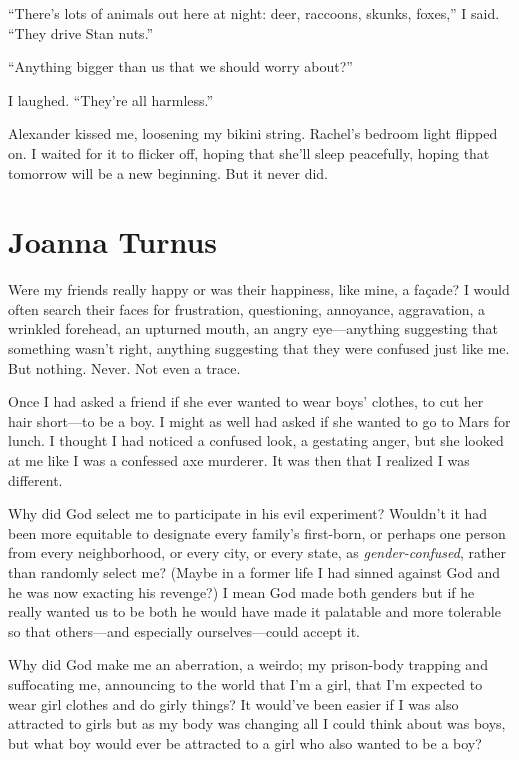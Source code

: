 ``There's lots of animals out here at night: deer, raccoons, skunks,
foxes,'' I said. ``They drive Stan nuts.''

``Anything bigger than us that we should worry about?''

I laughed. ``They're all harmless.''

Alexander kissed me, loosening my bikini string. Rachel's bedroom light
flipped on. I waited for it to flicker off, hoping that she'll sleep
peacefully, hoping that tomorrow will be a new beginning. But it never
did.

\chapter{Joanna Turnus}

\titlemark

Were my friends really happy or was their happiness, like mine, a
façade? I would often search their faces for frustration, questioning,
annoyance, aggravation, a wrinkled forehead, an upturned mouth, an angry
eye---anything suggesting that something wasn't right, anything
suggesting that they were confused just like me. But nothing. Never. Not
even a trace.

Once I had asked a friend if she ever wanted to wear boys' clothes, to
cut her hair short---to be a boy. I might as well had asked if she
wanted to go to Mars for lunch. I thought I had noticed a confused look,
a gestating anger, but she looked at me like I was a confessed axe
murderer. It was then that I realized I was different.

Why did God select me to participate in his evil experiment? Wouldn't it
had been more equitable to designate every family's first-born, or
perhaps one person from every neighborhood, or every city, or every
state, as \emph{gender-confused}, rather than randomly select me? (Maybe
in a former life I had sinned against God and he was now exacting his
revenge?) I mean God made both genders but if he really wanted us to be
both he would have made it palatable and more tolerable so that
others---and especially ourselves---could accept it.

Why did God make me an aberration, a weirdo; my prison-body trapping and
suffocating me, announcing to the world that I'm a girl, that I'm
expected to wear girl clothes and do girly things? It would've been
easier if I was also attracted to girls but as my body was changing all
I could think about was boys, but what boy would ever be attracted to a
girl who also wanted to be a boy?

